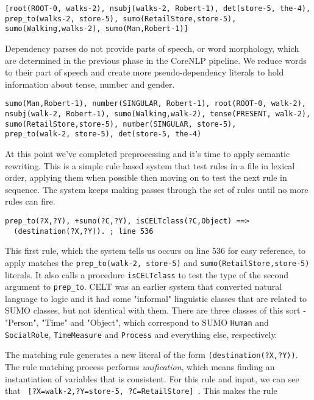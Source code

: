 \documentclass{book}
\begin{document}
\begin{verbatim}
[root(ROOT-0, walks-2), nsubj(walks-2, Robert-1), det(store-5, the-4), 
prep_to(walks-2, store-5), sumo(RetailStore,store-5), 
sumo(Walking,walks-2), sumo(Man,Robert-1)]
\end{verbatim}

Dependency parses do not provide parts of speech, or word morphology, which are
determined in the previous phase in the CoreNLP pipeline.  We reduce words to
their part of speech and create more pseudo-dependency literals to hold
information about tense, number and gender.

\begin{verbatim}
sumo(Man,Robert-1), number(SINGULAR, Robert-1), root(ROOT-0, walk-2), 
nsubj(walk-2, Robert-1), sumo(Walking,walk-2), tense(PRESENT, walk-2), 
sumo(RetailStore,store-5), number(SINGULAR, store-5), 
prep_to(walk-2, store-5), det(store-5, the-4)
\end{verbatim}

At this point we've completed preprocessing and it's time to apply semantic 
rewriting.  This is a simple rule based system that test rules in a file in
lexical order, applying them when possible then moving on to test the next
rule in sequence.  The system keeps making passes through the set of rules
until no more rules can fire.

\begin{verbatim}
prep_to(?X,?Y), +sumo(?C,?Y), isCELTclass(?C,Object) ==> 
  (destination(?X,?Y)). ; line 536
\end{verbatim}

\begin{sloppypar}
This first rule, which the system tells us occurs on line 536 for easy reference,
to apply matches the \texttt{prep\_to(walk-2, store-5)} and
\texttt{sumo(RetailStore,store-5)} literals.  It also calls a
procedure \texttt{isCELTclass} to test the type of the second argument
to \texttt{prep\_to}.  CELT was an earlier system that converted natural
language to logic and it had some "informal" linguistic classes that
are related to SUMO classes, but not identical with them.  There are
three classes of this sort - "Person", "Time" and "Object", which
correspond to SUMO \texttt{Human} and \texttt{SocialRole}, \texttt{TimeMeasure}
and \texttt{Process} and everything else, respectively.
\end{sloppypar}

The matching rule generates a new literal of the form \texttt{(destination(?X,?Y))}.
The rule matching process performs \textit{unification}, which means finding
an instantiation of variables that is consistent.  For this rule and input, we
can see that \texttt{ [?X=walk-2,?Y=store-5, ?C=RetailStore] }. This makes the
rule 
\end{document}
